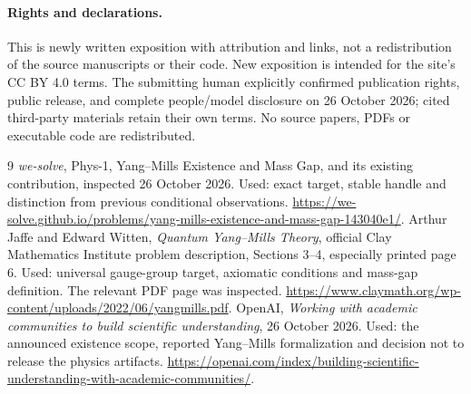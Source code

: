 \documentclass[11pt,a4paper]{article}
\numberwithin{equation}{section}
\theoremstyle{definition}
\theoremstyle{remark}
\begin{document}
\paragraph{Rights and declarations.}
This is newly written exposition with attribution and links, not a redistribution
of the source manuscripts or their code. New exposition is intended for the
site's CC BY 4.0 terms. The submitting human explicitly confirmed publication rights, public release, and complete people/model disclosure on 26 October 2026; cited third-party materials retain their own terms. No source papers, PDFs or executable code are redistributed.
\begin{thebibliography}{9}
 \emph{we-solve}, Phys-1, Yang--Mills Existence and Mass Gap, and its existing contribution, inspected 26 October 2026. Used: exact target, stable handle and distinction from previous conditional observations.
\url{https://we-solve.github.io/problems/yang-mills-existence-and-mass-gap-143040e1/}.
 Arthur Jaffe and Edward Witten, \emph{Quantum Yang--Mills Theory}, official Clay Mathematics Institute problem description, Sections 3--4, especially printed page 6. Used: universal gauge-group target, axiomatic conditions and mass-gap definition. The relevant PDF page was inspected.
\url{https://www.claymath.org/wp-content/uploads/2022/06/yangmills.pdf}.
 OpenAI, \emph{Working with academic communities to build scientific understanding}, 26 October 2026. Used: the announced existence scope, reported Yang--Mills formalization and decision not to release the physics artifacts.
\url{https://openai.com/index/building-scientific-understanding-with-academic-communities/}.
\end{thebibliography}
\end{document}
